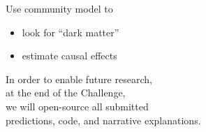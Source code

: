 \documentclass{beamer}
\begin{document}
\begin{frame}

Use community model to
\begin{itemize}
\item look for ``dark matter''
\item estimate causal effects
\end{itemize}

\end{frame}
\begin{frame}

\Large{
\begin{center}
In order to enable future research,\\at the end of the Challenge,\\we will open-source all submitted\\predictions, code, and narrative explanations.
\end{center}
}

\end{frame}
\end{document}

